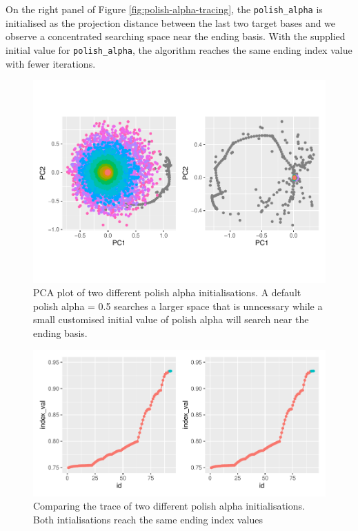 \documentclass[12pt]{article}
\begin{document}
On the right panel of Figure \ref{fig:polish-alpha-tracing}, the
\texttt{polish\_alpha} is initialised as the projection distance between
the last two target bases and we observe a concentrated searching space
near the ending basis. With the supplied initial value for
\texttt{polish\_alpha}, the algorithm reaches the same ending index
value with fewer iterations.

\begin{figure}
\centering
\includegraphics{paper_files/figure-latex/polish-alpha-1.pdf}
\caption{PCA plot of two different polish alpha initialisations. A
default polish alpha = 0.5 searches a larger space that is unncessary
while a small customised initial value of polish alpha will search near
the ending basis.}
\end{figure}

\begin{figure}
\centering
\includegraphics{paper_files/figure-latex/polish-alpha-tracing-1.pdf}
\caption{Comparing the trace of two different polish alpha
initialisations. Both intialisations reach the same ending index values}
\end{figure}
\end{document}
